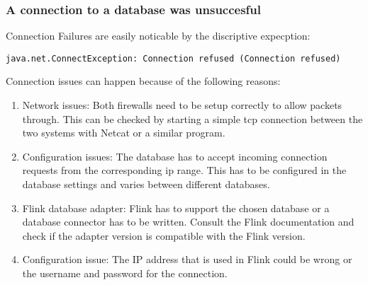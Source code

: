 \subsubsection{A connection to a database was unsuccesful}
Connection Failures are easily noticable by the discriptive expecption:
\begin{lstlisting}
java.net.ConnectException: Connection refused (Connection refused)
\end{lstlisting}
Connection issues can happen because of the following reasons:
\begin{enumerate}
\item Network issues: Both firewalls need to be setup correctly to allow packets through. This can be checked by starting a simple tcp connection between the two systems with Netcat or a similar program.
\item Configuration issues: The database has to accept incoming connection requests from the corresponding ip range. This has to be configured in the database settings and varies between different databases.
\item Flink database adapter: Flink has to support the chosen database or a database connector has to be written. Consult the Flink documentation and check if the adapter version is compatible with the Flink version.
\item Configuration issue: The IP address that is used in Flink could be wrong or the username and password for the connection.
\end{enumerate}
